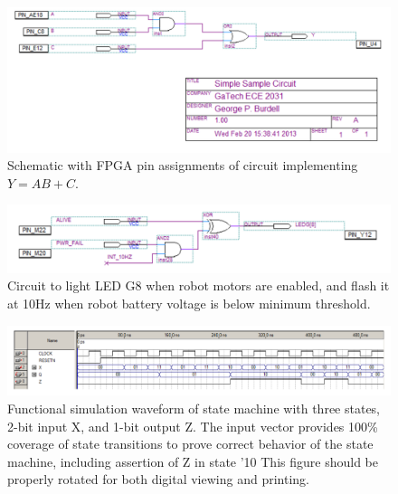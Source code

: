 \documentclass[letterpaper,11pt]{article}
\begin{document}
\begin{figure}[H]
   \centering
   \includegraphics{simple_circuit.png} %
      \caption{Schematic with FPGA pin assignments of circuit implementing $Y = AB + C$.} %
\end{figure}   

\begin{figure}[H]
   \centering %
   \includegraphics{complicated_circuit.png}
      \caption{Circuit to light LED G8 when robot motors are enabled, and flash it at 10Hz when robot battery voltage is below minimum threshold.} %
\end{figure}   

\begin{landscape} %
\begin{figure}
	\centering
	\includegraphics{landscape_figure.png}
	  \caption{Functional simulation waveform of state machine with three states, 2-bit input X, and 1-bit output Z. The input vector provides 100\% coverage of state transitions to prove correct behavior of the state machine, including assertion of Z in state '10 This figure should be properly rotated for both digital viewing and printing.}
\end{figure}
\end{landscape}
\end{document}

